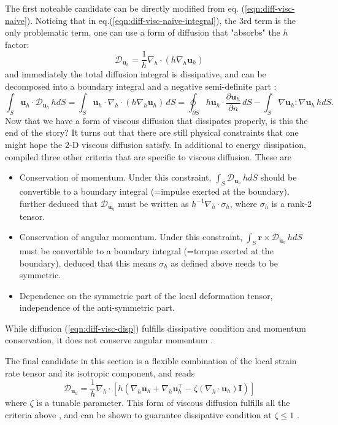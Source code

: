 The first noteable candidate can be directly modified from eq. (\ref{eqn:diff-visc-naive}). Noticing that in eq.(\ref{eqn:diff-visc-naive-integral}), the 3rd term is the only problematic term, one can use a form of diffusion that "absorbs" the $h$ factor:
\begin{equation}\label{eqn:diff-visc-disp}
    \mathcal{D}_{\mathbf{u}_h} = \frac{1}{h} \nabla_h \cdot \left(h \nabla_h \mathbf{u}_h\right)
\end{equation}
and immediately the total diffusion integral is dissipative, and can be decomposed into a boundary integral and a negative semi-definite part \parencite{gent_energetically_1993}:
\[
\int_S \mathbf{u}_h\cdot \mathcal{D}_{\mathbf{u}_h} \, h dS = \int_S \mathbf{u}_h \cdot \nabla_h\cdot \left(h \nabla_h \mathbf{u}_h\right) \, dS = \oint_{\partial S} h \mathbf{u}_h \cdot \frac{\partial \mathbf{u}_h}{\partial n} \, dS  - \int_S \nabla \mathbf{u}_h : \nabla \mathbf{u}_h \, hdS.
\]
Now that we have a form of viscous diffusion that dissipates properly, is this the end of the story? It turns out that there are still physical constraints that one might hope the 2-D viscous diffusion satisfy. In additional to energy dissipation, \textcite{shchepetkin_physically_1996} compiled three other criteria that are specific to viscous diffusion. These are
\begin{itemize}
    \item Conservation of momentum. Under this constraint, $\int_S \mathcal{D}_{\mathbf{u}_h} \, hdS$ should be convertible to a boundary integral (=impulse exerted at the boundary). \textcite{shchepetkin_physically_1996} further deduced that $\mathcal{D}_{\mathbf{u}_h}$ must be written as $h^{-1} \nabla_h \cdot \sigma_h$, where $\sigma_h$ is a rank-2 tensor.
    \item Conservation of angular momentum. Under this constraint, $\int_S \mathbf{r}\times \mathcal{D}_{\mathbf{u}_h} \, hdS$ must be convertible to a boundary integral (=torque exerted at the boundary). \textcite{shchepetkin_physically_1996} deduced that this means $\sigma_h$ as defined above needs to be symmetric.
    \item Dependence on the symmetric part of the local deformation tensor, independence of the anti-symmetric part.
\end{itemize}
While diffusion (\ref{eqn:diff-visc-disp}) fulfills dissipative condition and momentum conservation, it does not conserve angular momentum \parencite{shchepetkin_physically_1996}. 

The final candidate in this section is a flexible combination of the local strain rate tensor and its isotropic component, and reads
\begin{equation}\label{eqn:diff-visc-conserve}
    \mathcal{D}_{\mathbf{u}_h} = \frac{1}{h} \nabla_h \cdot \left[h \left(\nabla_h \mathbf{u}_h + \nabla_h \mathbf{u}_h^\intercal - \zeta (\nabla_h\cdot \mathbf{u}_h)\mathbf{I}\right)\right]
\end{equation}
where $\zeta$ is a tunable parameter.
This form of viscous diffusion fulfills all the criteria above \parencite{shchepetkin_physically_1996}, and can be shown to guarantee dissipative condition at $\zeta \leq 1$ \parencite{gilbert_form_2014}.

